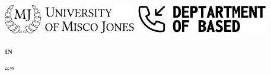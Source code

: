 % 
% 
% 



\thispagestyle{empty}

\setcounter{page}{1}




\begin{center}
    \includegraphics[height=13mm]{opening/resources/logos/uni-misco.pdf}  %
    \hfill
    \includegraphics[height=13mm]{opening/resources/logos/uni-based.pdf}
\end{center}

\vspace*{30mm}

\begin{center}
    \textbf{\large \textsc{{\thesisDegree} in}}\\
    \textbf{\large \textsc{\thesisArea}}
\end{center}

\vspace*{0mm}

\begin{center}
    \textbf{\large \thesisType}
\end{center}

\vspace*{10mm}

\begin{center}
    \textbf{{\LARGE {}``\thesisTitle''}}\\
\end{center}

